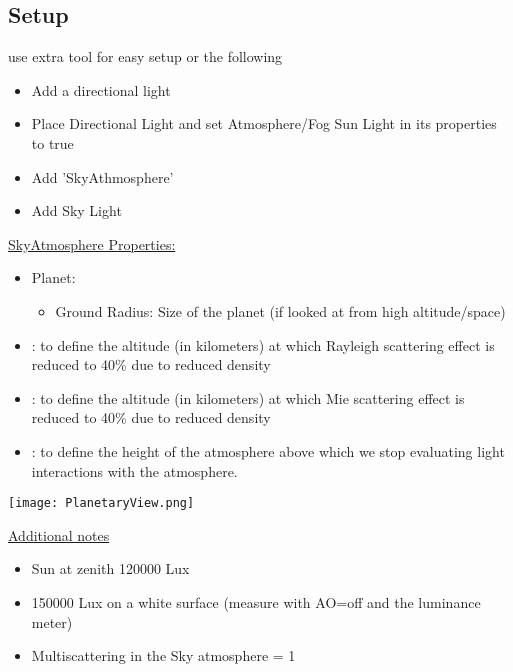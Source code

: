         \subsection{Setup}
            use extra tool for easy setup  or the following\\
            \begin{itemize}
                \item Add a directional light
                \item Place Directional Light and set Atmosphere/Fog Sun Light in its properties to true
                \item Add 'SkyAthmosphere'
                \item Add Sky Light
            \end{itemize}

            \underline{SkyAtmosphere Properties:}
            \begin{itemize}
                \item Planet:
                \begin{itemize}
                    \item Ground Radius: Size of the planet (if looked at from high altitude/space)
                \end{itemize}                
                \item {}: to define the altitude (in kilometers) at which Rayleigh scattering effect is reduced to 40\% due to reduced density
                \item {}: to define the altitude (in kilometers) at which Mie scattering effect is reduced to 40\% due to reduced density
                \item {}: to define the height of the atmosphere above which we stop evaluating light interactions with the atmosphere.        
            \end{itemize}
            \texttt{[image: PlanetaryView.png]}

            \underline{Additional notes}
                \begin{itemize}
                    \item Sun at zenith 120000 Lux
                    \item 150000 Lux on a white surface (measure with AO=off and the luminance meter)
                    \item Multiscattering in the Sky atmosphere = 1
                \end{itemize}

